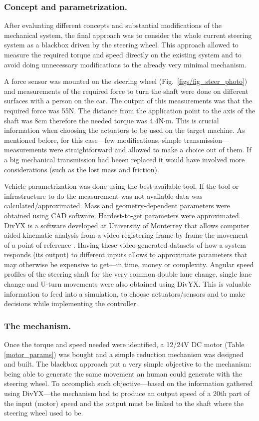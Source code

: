 \documentclass[twocolumn,10pt]{asme2e}
\begin{document}
\subsubsection*{Concept and parametrization.}
After evaluating different concepts and substantial modifications of
the mechanical system, the final approach was to consider the whole
current steering system as a blackbox driven by the steering wheel.
This approach allowed to measure the required torque and speed directly
on the existing system and to avoid doing unnecessary modifications
to the already very minimal mechanism.

A force sensor was mounted on the steering wheel (Fig.~\ref{figs/fig_steer_photo})
and measurements of the required force to turn the shaft were done on
different surfaces with a person on the car. The output of this measurements
was that the required force was 55N. The distance from the application point
to the axis of the shaft was 8cm therefore the needed torque was 4.4N$\cdot$m.
This is crucial information when choosing the actuators to be used on the
target machine. As mentioned before, for this case---few modifications, simple
transmission---measurements were straightforward and allowed to make a choice out of them.
If a big mechanical transmission had beeen replaced it would have involved more
considerations (such as the lost mass and friction).

Vehicle parametrization was done using the best available tool. If the
tool or infrastructure to do the measurement was not available data was
calculated/approximated. Mass and geometry-dependent parameters were
obtained using CAD software. Hardest-to-get parameters were approximated.
DivYX is a software developed at University of Monterrey that allows
computer aided kinematic analysis from a video registering frame by frame
the movement of a point of reference \cite{lperez}. Having these video-generated datasets
of how a system responds (its output) to different inputs allows to approximate
parameters that may otherwise be expensive to get---in time, money or complexity. Angular speed profiles
of the steering shaft for the very common double lane change, single lane
change and U-turn movements were also obtained using DivYX. This
is valuable information to feed into a simulation, to choose actuators/sensors
and to make decisions while implementing the controller.

\subsubsection*{The mechanism.}
Once the torque and speed needed were identified, a 12/24V DC motor (Table
\ref{motor_params}) was bought and a simple reduction mechanism was designed
and built. The blackbox approach put a very simple objective to the mechanism:
being able to generate the same movement an human could generate with the
steering wheel. To accomplish such objective---based on the information gathered
using DivYX---the mechanism had to produce an output speed of a 20th part of
the input (motor) speed and the output must be linked to the shaft where the
steering wheel used to be.
\end{document}
